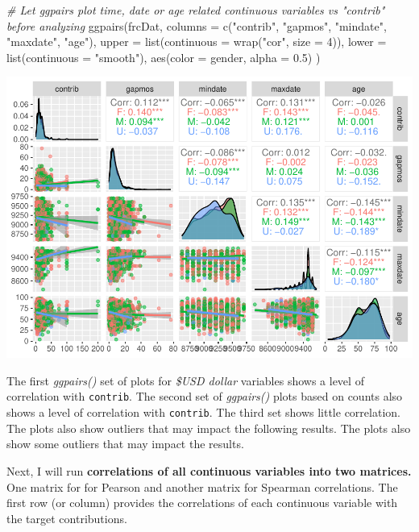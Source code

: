 \documentclass[
]{article}
\newenvironment{Shaded}{\begin{snugshade}}{\end{snugshade}}
\newcommand{\AttributeTok}[1]{\textcolor[rgb]{0.77,0.63,0.00}{#1}}
\newcommand{\CommentTok}[1]{\textcolor[rgb]{0.56,0.35,0.01}{\textit{#1}}}
\newcommand{\DecValTok}[1]{\textcolor[rgb]{0.00,0.00,0.81}{#1}}
\newcommand{\FloatTok}[1]{\textcolor[rgb]{0.00,0.00,0.81}{#1}}
\newcommand{\FunctionTok}[1]{\textcolor[rgb]{0.00,0.00,0.00}{#1}}
\newcommand{\NormalTok}[1]{#1}
\newcommand{\StringTok}[1]{\textcolor[rgb]{0.31,0.60,0.02}{#1}}
\begin{document}
\begin{Shaded}
\begin{Highlighting}[]
\CommentTok{\# Let ggpairs plot time, date or age related continuous variables vs "contrib" before analyzing}
\FunctionTok{ggpairs}\NormalTok{(frcDat, }\AttributeTok{columns =} \FunctionTok{c}\NormalTok{(}\StringTok{"contrib"}\NormalTok{, }\StringTok{"gapmos"}\NormalTok{, }\StringTok{"mindate"}\NormalTok{, }\StringTok{"maxdate"}\NormalTok{, }\StringTok{"age"}\NormalTok{), }
        \AttributeTok{upper =} \FunctionTok{list}\NormalTok{(}\AttributeTok{continuous =} \FunctionTok{wrap}\NormalTok{(}\StringTok{"cor"}\NormalTok{, }\AttributeTok{size =} \DecValTok{4}\NormalTok{)),}
        \AttributeTok{lower =} \FunctionTok{list}\NormalTok{(}\AttributeTok{continuous =} \StringTok{"smooth"}\NormalTok{),}
        \FunctionTok{aes}\NormalTok{(}\AttributeTok{color =}\NormalTok{ gender,  }
            \AttributeTok{alpha =} \FloatTok{0.5}\NormalTok{)}
\NormalTok{        )}
\end{Highlighting}
\end{Shaded}

\includegraphics{linear_regression__uc_files/figure-latex/unnamed-chunk-1-3.pdf}

The first \emph{ggpairs()} set of plots for \emph{\$USD dollar}
variables shows a level of correlation with \texttt{contrib}. The second
set of \emph{ggpairs()} plots based on counts also shows a level of
correlation with \texttt{contrib}. The third set shows little
correlation. The plots also show outliers that may impact the following
results. The plots also show some outliers that may impact the results.

Next, I will run \textbf{correlations of all continuous variables into
two matrices.} One matrix for for Pearson and another matrix for
Spearman correlations. The first row (or column) provides the
correlations of each continuous variable with the target contributions.
\end{document}
